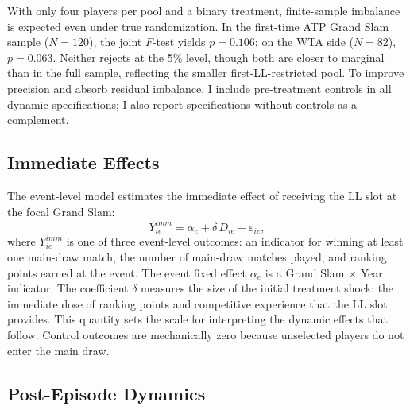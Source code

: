 With only four players per pool and a binary treatment, finite-sample imbalance is expected even under true randomization. In the first-time ATP Grand Slam sample ($N = 120$), the joint $F$-test yields $p = 0.106$; on the WTA side ($N = 82$), $p = 0.063$. Neither rejects at the 5\% level, though both are closer to marginal than in the full sample, reflecting the smaller first-LL-restricted pool. To improve precision and absorb residual imbalance, I include pre-treatment controls in all dynamic specifications; I also report specifications without controls as a complement.

\subsection{Immediate Effects}
\label{sec:strategy_immediate}

The event-level model estimates the immediate effect of receiving the LL slot at the focal Grand Slam:
\begin{equation}
\label{eq:immediate}
Y^{imm}_{ie} = \alpha_e + \delta \, D_{ie} + \varepsilon_{ie},
\end{equation}
where $Y^{imm}_{ie}$ is one of three event-level outcomes: an indicator for winning at least one main-draw match, the number of main-draw matches played, and ranking points earned at the event. The event fixed effect $\alpha_e$ is a Grand Slam $\times$ Year indicator. The coefficient $\delta$ measures the size of the initial treatment shock: the immediate dose of ranking points and competitive experience that the LL slot provides. This quantity sets the scale for interpreting the dynamic effects that follow. Control outcomes are mechanically zero because unselected players do not enter the main draw.

\subsection{Post-Episode Dynamics}
\label{sec:strategy_dynamics}

